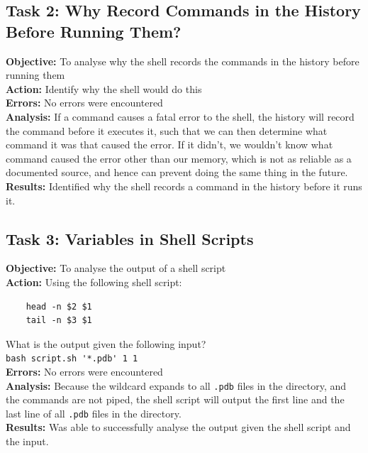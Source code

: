 \documentclass{article}
\begin{document}
\subsection{Task 2: Why Record Commands in the History Before Running Them?}
%
\textbf{Objective:} To analyse why the shell records the commands in the history before running them\\
\textbf{Action:} Identify why the shell would do this\\
\textbf{Errors:} No errors were encountered\\
\textbf{Analysis:} If a command causes a fatal error to the shell, the history will record the command before it executes it, such that we can then determine what command it was that caused the error. If it didn't, we wouldn't know what command caused the error other than our memory, which is not as reliable as a documented source, and hence can prevent doing the same thing in the future.\\
\textbf{Results:} Identified why the shell records a command in the history before it runs it.
%
\subsection{Task 3: Variables in Shell Scripts}
%
\textbf{Objective:} To analyse the output of a shell script\\
\textbf{Action:} Using the following shell script:
\begin{verbatim}
    head -n $2 $1
    tail -n $3 $1
\end{verbatim}
What is the output given the following input?\\
\verb|bash script.sh '*.pdb' 1 1|\\
\textbf{Errors:} No errors were encountered\\
\textbf{Analysis:} Because the wildcard expands to all \verb|.pdb| files in the directory, and the commands are not piped, the shell script will output the first line and the last line of all \verb|.pdb| files in the directory.\\
\textbf{Results:} Was able to successfully analyse the output given the shell script and the input.
%
\end{document}
